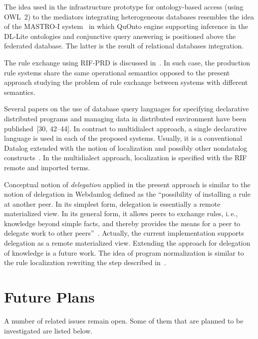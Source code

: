 \begin{multicols}{2}
  The idea used in the infrastructure prototype for ontology-based access (using
OWL~2) to the mediators integrating heterogeneous databases resembles the idea of
the MASTRO-I system~\cite{43-kal} in which QuOnto engine supporting inference
in the DL-Lite ontologies and conjunctive query answering is positioned above the
federated database. The latter is the result of relational databases integration.

  The rule exchange using RIF-PRD is
discussed in~\cite{44-kal, 45-kal}. In such case, the production rule systems share the
same operational semantics opposed to the present approach studying the problem of rule
exchange between systems with different semantics.

  Several papers on the use of database query languages for specifying declarative
distributed programs and managing data in distributed environment have been
published~[30, 42--44]. In contrast to multidialect approach,
a single declarative language is used in each of the proposed systems. Usually, it is a
conventional Datalog extended with the notion of localization and possibly other
  nondatalog constructs~\cite{48-kal}. In the multidialect approach, localization is
specified with the RIF remote and imported terms.

  Conceptual notion of \textit{delegation} applied in the present approach is similar to the
notion of delegation in Webdamlog defined as the ``possibility of installing a rule at
another peer. In its simplest form, delegation is essentially a remote materialized
view. In its general form, it allows peers to exchange rules, i.\,e., knowledge beyond
simple facts, and thereby provides the means for a peer to delegate work to other
peers''~\cite{16-kal}. Actually, the current implementation supports delegation as a
remote materialized view. Extending the approach for delegation of knowledge is a
future work. The idea of program normalization is similar to the rule localization
rewriting the step described in~\cite{48-kal}.

\vspace*{-6pt}

    \section{Future Plans}
    
    \vspace*{-2pt}

  A number of related issues remain open. Some of them that are planned to be
investigated are listed below.
{ %

}
\end{multicols}
